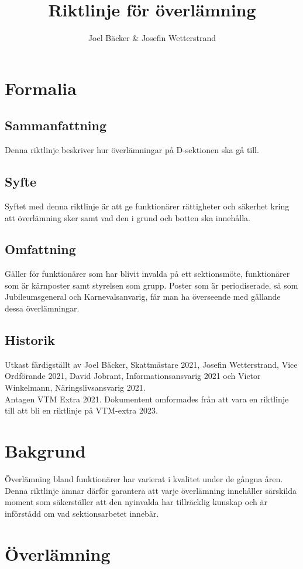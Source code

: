 \documentclass[]{dsekprotokoll}
\title{Riktlinje för överlämning}
\author{Joel Bäcker \& Josefin Wetterstrand}
\begin{document}
\section{Formalia}
\subsection{Sammanfattning}
Denna riktlinje beskriver hur överlämningar på D-sektionen ska gå till.

\subsection{Syfte}
Syftet med denna riktlinje är att ge funktionärer rättigheter och
säkerhet kring att överlämning sker samt vad den i grund och botten
ska innehålla.

\subsection{Omfattning} %
Gäller för funktionärer som har blivit invalda på ett sektionsmöte,
funktionärer som är kärnposter samt styrelsen som grupp. Poster som
är periodiserade, så som Jubileumsgeneral och Karnevalsanvarig, får
man ha överseende med gällande dessa överlämningar.

\subsection{Historik}
Utkast färdigställt av Joel Bäcker, Skattmästare 2021, Josefin
Wetterstrand, Vice Ordförande 2021, David Jobrant,
Informationsansvarig 2021 och Victor Winkelmann, Näringslivsansvarig 2021.
\\ Antagen VTM Extra 2021. Dokumentent omformades från att vara en
riktlinje till att bli en riktlinje på VTM-extra 2023.
\section{Bakgrund}
Överlämning bland funktionärer har varierat i kvalitet under de
gångna åren. Denna riktlinje ämnar därför garantera att varje
överlämning innehåller särskilda moment som säkerställer att den
nyinvalda har tillräcklig kunskap och är införstådd om vad
sektionsarbetet innebär.

\section{Överlämning}
\end{document}
